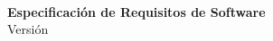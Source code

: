 \begin{center}
  \Huge{\scshape{\textbf{\appname{}}}} \\

  \vspace{16cm}

  \Large{\textbf{Especificación de Requisitos de Software}} \\
  Versión \version{}
\end{center}